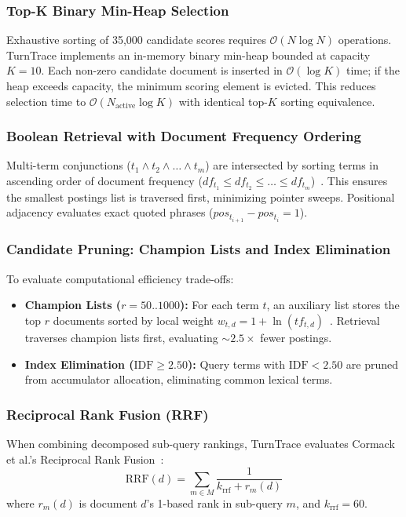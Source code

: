 \documentclass[10pt,a4paper,twocolumn]{article}
\begin{document}
\subsubsection{Top-K Binary Min-Heap Selection}
Exhaustive sorting of 35,000 candidate scores requires $\mathcal{O}(N \log N)$ operations. TurnTrace implements an in-memory binary min-heap bounded at capacity $K=10$. Each non-zero candidate document is inserted in $\mathcal{O}(\log K)$ time; if the heap exceeds capacity, the minimum scoring element is evicted. This reduces selection time to $\mathcal{O}(N_{\text{active}} \log K)$ with identical top-$K$ sorting equivalence.

\subsubsection{Boolean Retrieval with Document Frequency Ordering}
Multi-term conjunctions ($t_1 \land t_2 \land \dots \land t_m$) are intersected by sorting terms in ascending order of document frequency ($df_{t_1} \le df_{t_2} \le \dots \le df_{t_m}$)~\cite{manning2008introduction}. This ensures the smallest postings list is traversed first, minimizing pointer sweeps. Positional adjacency evaluates exact quoted phrases ($pos_{t_{i+1}} - pos_{t_i} = 1$).

\subsubsection{Candidate Pruning: Champion Lists and Index Elimination}
To evaluate computational efficiency trade-offs:
\begin{itemize}
    \item \textbf{Champion Lists ($r=50..1000$):} For each term $t$, an auxiliary list stores the top $r$ documents sorted by local weight $w_{t,d} = 1 + \ln(tf_{t,d})$~\cite{manning2008introduction}. Retrieval traverses champion lists first, evaluating $\sim 2.5\times$ fewer postings.
    \item \textbf{Index Elimination ($\text{IDF} \ge 2.50$):} Query terms with $\text{IDF} < 2.50$ are pruned from accumulator allocation, eliminating common lexical terms.
\end{itemize}

\subsubsection{Reciprocal Rank Fusion (RRF)}
When combining decomposed sub-query rankings, TurnTrace evaluates Cormack et al.'s Reciprocal Rank Fusion~\cite{cormack2009reciprocal}:
\begin{equation}
    \text{RRF}(d) = \sum_{m \in M} \frac{1}{k_{\text{rrf}} + r_m(d)}
\end{equation}
where $r_m(d)$ is document $d$'s 1-based rank in sub-query $m$, and $k_{\text{rrf}} = 60$.
\end{document}
